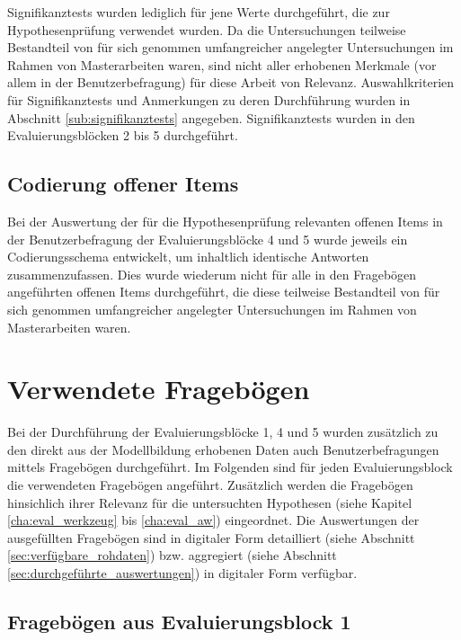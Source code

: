 Signifikanztests wurden lediglich für jene Werte durchgeführt, die zur Hypothesenprüfung verwendet wurden. Da die Untersuchungen teilweise Bestandteil von für sich genommen umfangreicher angelegter Untersuchungen im Rahmen von Masterarbeiten waren, sind nicht aller erhobenen Merkmale (vor allem in der Benutzerbefragung) für diese Arbeit von Relevanz. Auswahlkriterien für Signifikanztests und Anmerkungen zu deren Durchführung wurden in Abschnitt \ref{sub:signifikanztests} angegeben. Signifikanztests wurden in den Evaluierungsblöcken 2 bis 5 durchgeführt.


\subsection{Codierung offener Items} %
\label{sub:codierung_offener_items}

Bei der Auswertung der für die Hypothesenprüfung relevanten offenen Items in der Benutzerbefragung der Evaluierungsblöcke 4 und 5 wurde jeweils ein Codierungsschema entwickelt, um inhaltlich identische Antworten zusammenzufassen. Dies wurde wiederum nicht für alle in den Fragebögen angeführten offenen Items durchgeführt, die diese teilweise Bestandteil von für sich genommen umfangreicher angelegter Untersuchungen im Rahmen von Masterarbeiten waren. 


\section{Verwendete Fragebögen} %
\label{sec:frageboegen}

Bei der Durchführung der Evaluierungsblöcke 1, 4 und 5 wurden zusätzlich zu den direkt aus der Modellbildung erhobenen Daten auch Benutzerbefragungen mittels Fragebögen durchgeführt. Im Folgenden sind für jeden Evaluierungsblock die verwendeten Fragebögen angeführt. Zusätzlich werden die Fragebögen hinsichlich ihrer Relevanz für die untersuchten Hypothesen (siehe Kapitel \ref{cha:eval_werkzeug} bis \ref{cha:eval_aw}) eingeordnet. Die Auswertungen der ausgefüllten Fragebögen sind in digitaler Form detailliert (siehe Abschnitt \ref{sec:verfügbare_rohdaten}) bzw. aggregiert (siehe Abschnitt \ref{sec:durchgeführte_auswertungen}) in digitaler Form verfügbar.


\clearpage
\subsection{Fragebögen aus Evaluierungsblock 1}
\label{sub:fb_eval1}

